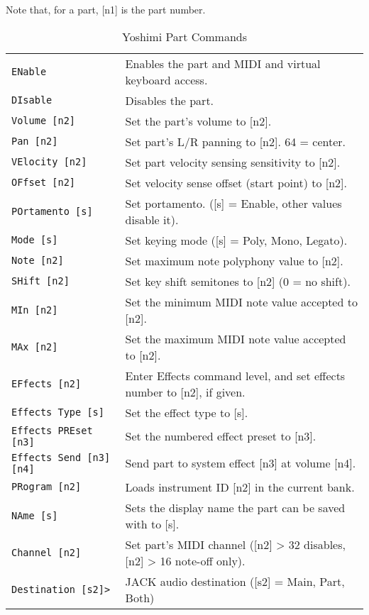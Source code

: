    Note that, for a part, [n1] is the part number.

   \begin{table}[H]
      \centering
      \caption{Yoshimi Part Commands}
      \label{table:yoshimi_text_part_commands}
      \begin{tabular}{l l}

\texttt{ENable} &
   Enables the part and MIDI and virtual keyboard access. \\
\texttt{DIsable} &
   Disables the part. \\
\texttt{Volume [n2]} &
   Set the part's volume to [n2]. \\
\texttt{Pan [n2]} &
   Set part's L/R panning to [n2]. 64 = center. \\
\texttt{VElocity [n2]} &
   Set part velocity sensing sensitivity to [n2]. \\
\texttt{OFfset [n2]} &
   Set velocity sense offset (start point) to [n2]. \\
\texttt{POrtamento [s]} &
   Set portamento. ([s] = Enable, other values disable it). \\
\texttt{Mode [s]} &
   Set keying mode ([s] = Poly, Mono, Legato). \\
\texttt{Note [n2]} &
   Set maximum note polyphony value to [n2]. \\
\texttt{SHift [n2]} &
   Set key shift semitones to [n2] (0 = no shift). \\
\texttt{MIn [n2]} &
   Set the minimum MIDI note value accepted to [n2]. \\
\texttt{MAx [n2]} &
   Set the maximum MIDI note value accepted to [n2]. \\
\texttt{EFfects [n2]} &
   Enter Effects command level, and set effects number to [n2], if given. \\
\texttt{Effects Type [s]} &
   Set the effect type to [s]. \\
\texttt{Effects PREset [n3]} &
   Set the numbered effect preset to [n3]. \\
\texttt{Effects Send [n3] [n4]} &
   Send part to system effect [n3] at volume [n4]. \\
\texttt{PRogram [n2]} &
   Loads instrument ID [n2] in the current bank. \\
\texttt{NAme [s]} &
   Sets the display name the part can be saved with to [s]. \\
\texttt{Channel [n2]} &
   Set part's MIDI channel ([n2] > 32 disables, [n2] > 16 note-off only). \\
\texttt{Destination [s2]>} &
   JACK audio destination ([s2] = Main, Part, Both) \\

      \end{tabular}
   \end{table}


